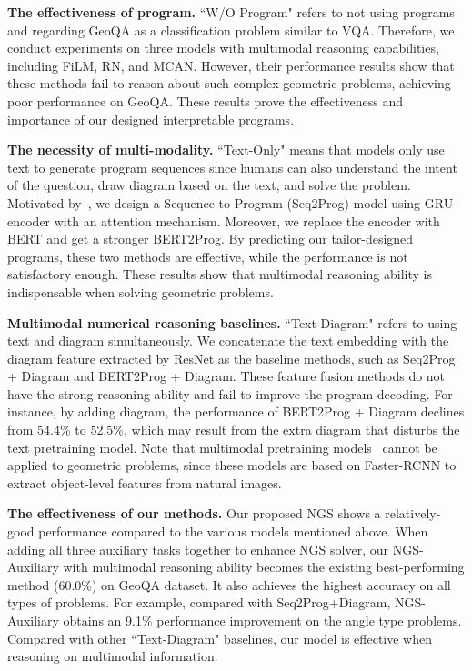 \documentclass[11pt,a4paper]{article}
\begin{document}
\textbf{The effectiveness of program.} ``W/O Program" refers to not using programs and regarding GeoQA as a classification problem similar to VQA. Therefore, we conduct experiments on three models with multimodal reasoning capabilities, including FiLM, RN, and MCAN. However, their performance results show that these methods fail to reason about such complex geometric problems, achieving poor performance on GeoQA. 
These results prove the effectiveness and importance of our designed interpretable programs.

\textbf{The necessity of multi-modality.} ``Text-Only" means that models only use text to generate program sequences since humans can also understand the intent of the question, draw diagram based on the text, and solve the problem. Motivated by~\citet{amini2019mathqa}, we design a Sequence-to-Program (Seq2Prog) model using GRU encoder with an attention mechanism. Moreover, we replace the encoder with BERT and get a stronger BERT2Prog. By predicting our tailor-designed programs, these two methods are effective, while the performance is not satisfactory enough. 
These results show that multimodal reasoning ability is indispensable when solving geometric problems.





\textbf{Multimodal numerical reasoning baselines. }``Text-Diagram" refers to using text and diagram simultaneously. We concatenate the text embedding with the diagram feature extracted by ResNet \cite{he2016deep} as the baseline methods, such as Seq2Prog + Diagram and BERT2Prog + Diagram. 
These feature fusion methods do not have the strong reasoning ability and fail to improve the program decoding. 
For instance, by adding diagram, the performance of BERT2Prog + Diagram declines from 54.4\% to 52.5\%, which may result from the extra diagram that disturbs the text pretraining model.
Note that multimodal pretraining models~\cite{lu2019vilbert,li2020unicoder} cannot be applied to geometric problems, since these models are based on Faster-RCNN to extract object-level features from natural images.



\textbf{The effectiveness of our methods.}
Our proposed NGS shows a relatively-good performance compared to the various models mentioned above. When adding all three auxiliary tasks together to enhance NGS solver, our NGS-Auxiliary with multimodal reasoning ability  becomes the existing best-performing method (60.0\%) on GeoQA dataset.
It also achieves the highest accuracy on all types of problems. For example, compared with Seq2Prog+Diagram, NGS-Auxiliary obtains an 9.1\% performance improvement on the angle type problems.
Compared with other ``Text-Diagram" baselines, our model is effective when reasoning on multimodal information.
\end{document}
